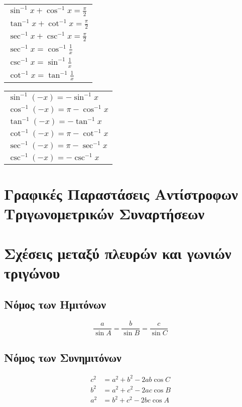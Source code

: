    \begin{tabular}{l}
       $ \sin^{-1}{x} + \cos^{-1}{x} = \frac{\pi}{2} $ \\
       $ \tan^{-1}{x} + \cot^{-1}{x} = \frac{\pi}{2} $ \\
       $ \sec^{-1}{x} + \csc^{-1}{x} = \frac{\pi}{2} $ \\
       $ \sec^{-1}{x} = \cos^{-1}{\frac{1}{x}} $ \\
       $ \csc^{-1}{x} = \sin^{-1}{\frac{1}{x}} $ \\
       $ \cot^{-1}{x} = \tan^{-1}{\frac{1}{x}} $ 
   \end{tabular}

   \begin{tabular}{l}
       $ \sin^{-1}{(-x)} = - \sin^{-1}{x} $ \\
       $ \cos^{-1}{(-x)} = \pi - \cos^{-1}{x} $ \\
       $ \tan^{-1}{(-x)} = - \tan^{-1}{x} $ \\
       $ \cot^{-1}{(-x)} = \pi - \cot^{-1}{x} $ \\
       $ \sec^{-1}{(-x)} = \pi - \sec^{-1}{x} $ \\
       $ \csc^{-1}{(-x)} = - \csc^{-1}{x} $ 
   \end{tabular}
   
\section{Γραφικές Παραστάσεις Αντίστροφων Τριγωνομετρικών Συναρτήσεων}

\section{Σχέσεις μεταξύ πλευρών και γωνιών τριγώνου}

\subsection{Νόμος των Ημιτόνων}
\[
 \frac{a}{\sin{A}} = \frac{b}{\sin{B}} = \frac{c}{\sin{C}} 
\] 

\subsection{Νόμος των Συνημιτόνων}

\begin{align*}
    c^{2} &= a^{2} + b^{2} - 2ab \cos{C} \\
    b^{2} &= a^{2} + c^{2} - 2ac \cos{B} \\
    a^{2} &= b^{2} + c^{2} - 2bc \cos{A} 
\end{align*} 

